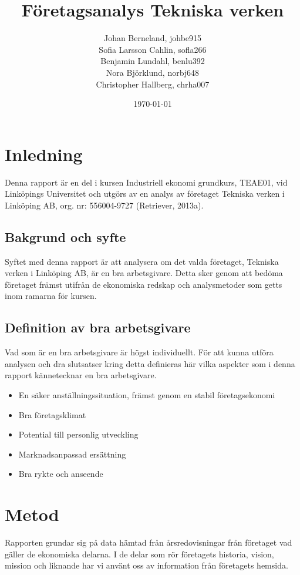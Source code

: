 \documentclass[10pt,a4paper]{article}
\title{Företagsanalys Tekniska verken}
\author{Johan Berneland, johbe915\\Sofia Larsson Cahlin, sofla266\\Benjamin Lundahl, benlu392\\
    Nora Björklund, norbj648\\Christopher Hallberg, chrha007}
\date{\today}
\begin{document}
\maketitle

\newpage

\tableofcontents

\newpage

\section{Inledning}
Denna rapport är en del i kursen Industriell ekonomi grundkurs, TEAE01, vid
Linköpings Universitet och utgörs av en analys av företaget Tekniska verken
i Linköping AB, org. nr: 556004-9727 (Retriever, 2013a).

\subsection{Bakgrund och syfte}
Syftet med denna rapport är att analysera om det valda företaget, Tekniska verken i Linköping AB, är en bra arbetsgivare. Detta sker genom att bedöma företaget främst utifrån de ekonomiska redskap och analysmetoder som getts inom ramarna för kursen. 
\subsection{Definition av bra arbetsgivare}
Vad som är en bra arbetsgivare är högst individuellt. För att kunna utföra analysen och dra slutsatser kring detta definieras här vilka aspekter som i denna rapport kännetecknar en bra arbetsgivare.

\begin{itemize}
 \item En säker anställningssituation, främst genom en stabil företagsekonomi 
 \item Bra företagsklimat
 \item Potential till personlig utveckling
 \item Marknadsanpassad ersättning
 \item Bra rykte och anseende
\end{itemize}

\section{Metod}
Rapporten grundar sig på data hämtad från årsredovisningar från företaget vad
gäller de ekonomiska delarna. I de delar som rör företagets historia, vision,
mission och liknande har vi använt oss av information från företagets hemsida.
\end{document}
